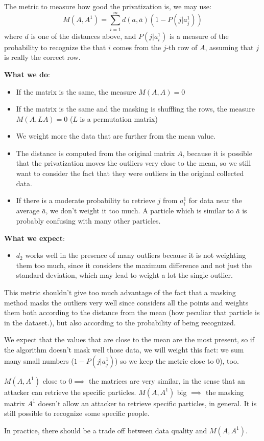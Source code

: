 \documentclass{article}
\begin{document}
The metric to measure how good the privatization is, we may use:
\begin{equation}
	M(A, A^1) = \sum_{i=1}^{m} d(a, \bar{a}) (1 - P(j| a_j^1) )
\end{equation}
where $d$ is one of the distances above, and $P(j | a_i^1)$ is a measure of the probability to recognize the that $i$ comes from the $j$-th row of $A$, assuming that $j$ is really the correct row. 

\textbf{What we do}:
\begin{itemize}
	\item If the matrix is the same, the measure $M(A, A) = 0$
	\item If the matrix is the same and the masking is shuffling the rows, the measure $M(A, LA) = 0$ ($L$ is a permutation matrix)
	\item We weight more the data that are further from the mean value.
	\item The distance is computed from the original matrix $A$, because it is possible that the privatization moves the outliers very close to the mean, so we still want to consider the fact that they were outliers in the original collected data.
	\item If there is a moderate probability to retrieve $j$ from $a_i^1$ for data near the average $\bar{a}$, we don't weight it too much. A particle which is similar to $\bar{a}$ is probably confusing with many other particles.
\end{itemize}
\textbf{What we expect}:
\begin{itemize}
	\item $d_2$ works well in the presence of many outliers because it is not weighting them too much, since it considers the maximum difference and not just the standard deviation, which may lead to weight a lot the single outlier.
\end{itemize}

This metric shouldn't give too much advantage of the fact that a masking method masks the outliers very well since considers all the points and weights them both according to the distance from the mean (how peculiar that particle is in the dataset.), but also according to the probability of being recognized.

We expect that the values that are close to the mean are the most present, so if the algorithm doesn't mask well those data, we will weight this fact: we sum many small numbers ($1-P(j| a_j^1)$) so we keep the metric close to $0$), too.

$M(A,A^1)$ close to $0 \implies $ the matrices are very similar, in the sense that an attacker can retrieve the specific particles. $M(A,A^1)$ big $\implies$ the masking matrix $A^1$ doesn't allow an attacker to retrieve specific particles, in general. It is still possible to recognize some specific people.

In practice, there should be a trade off between data quality and $M(A,A^1)$.
\end{document}
